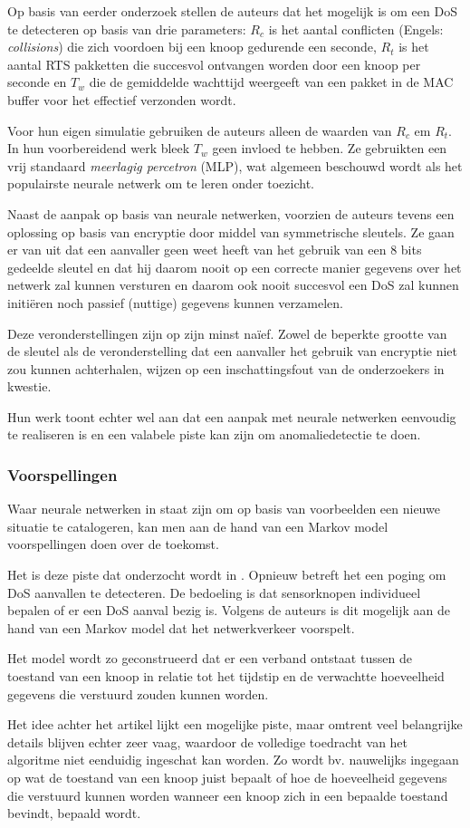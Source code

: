 Op basis van eerder onderzoek stellen de auteurs dat het mogelijk is om een DoS
te detecteren op basis van drie parameters: $R_c$ is het aantal conflicten
(Engels: \emph{collisions}) die zich voordoen bij een knoop gedurende een
seconde, $R_t$ is het aantal RTS pakketten die succesvol ontvangen worden door
een knoop per seconde en $T_w$ die de gemiddelde wachttijd weergeeft van een
pakket in de MAC buffer voor het effectief verzonden wordt.

Voor hun eigen simulatie gebruiken de auteurs alleen de waarden van $R_c$ em
$R_t$. In hun voorbereidend werk bleek $T_w$ geen invloed te hebben. Ze
gebruikten een vrij standaard \emph{meerlagig percetron} (MLP), wat algemeen
beschouwd wordt als het populairste neurale netwerk om te leren onder toezicht.

Naast de aanpak op basis van neurale netwerken, voorzien de auteurs tevens een
oplossing op basis van encryptie door middel van symmetrische sleutels. Ze gaan
er van uit dat een aanvaller geen weet heeft van het gebruik van een 8 bits
gedeelde sleutel en dat hij daarom nooit op een correcte manier gegevens over
het netwerk zal kunnen versturen en daarom ook nooit succesvol een DoS zal
kunnen initi\"eren noch passief (nuttige) gegevens kunnen verzamelen.

Deze veronderstellingen zijn op zijn minst na\"ief. Zowel de beperkte grootte
van de sleutel als de veronderstelling dat een aanvaller het gebruik van
encryptie niet zou kunnen achterhalen, wijzen op een inschattingsfout van de
onderzoekers in kwestie.

Hun werk toont echter wel aan dat een aanpak met neurale netwerken eenvoudig te
realiseren is en een valabele piste kan zijn om anomaliedetectie te doen.

\subsubsection*{Voorspellingen}
\label{subsubsection:predictions}

Waar neurale netwerken in staat zijn om op basis van voorbeelden een nieuwe
situatie te catalogeren, kan men aan de hand van een Markov model
voorspellingen doen over de toekomst.

Het is deze piste dat onderzocht wordt in \citep{zhijie2012intrusion}. Opnieuw
betreft het een poging om DoS aanvallen te detecteren. De bedoeling is dat
sensorknopen individueel bepalen of er een DoS aanval bezig is. Volgens de
auteurs is dit mogelijk aan de hand van een Markov model dat het netwerkverkeer
voorspelt.

Het model wordt zo geconstrueerd dat er een verband ontstaat tussen de toestand
van een knoop in relatie tot het tijdstip en de verwachtte hoeveelheid gegevens
die verstuurd zouden kunnen worden.

Het idee achter het artikel lijkt een mogelijke piste, maar omtrent veel
belangrijke details blijven echter zeer vaag, waardoor de volledige toedracht
van het algoritme niet eenduidig ingeschat kan worden. Zo wordt bv. nauwelijks
ingegaan op wat de toestand van een knoop juist bepaalt of hoe de
hoeveelheid gegevens die verstuurd kunnen worden wanneer een knoop zich in een
bepaalde toestand bevindt, bepaald wordt.
